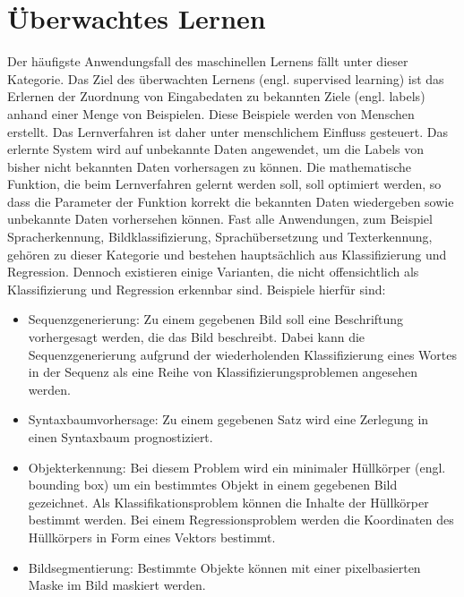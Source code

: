 \section{Überwachtes Lernen}
Der häufigste Anwendungsfall\cite{francois} des maschinellen Lernens fällt unter dieser Kategorie. Das Ziel des überwachten Lernens (engl. supervised learning) ist das Erlernen der Zuordnung von Eingabedaten zu bekannten Ziele (engl. labels) anhand einer Menge von Beispielen. Diese Beispiele werden von Menschen erstellt. Das Lernverfahren ist daher unter menschlichem Einfluss gesteuert\cite{MLkurz}. Das erlernte System wird auf unbekannte Daten angewendet, um die Labels von bisher nicht bekannten Daten vorhersagen zu können. Die mathematische Funktion, die beim Lernverfahren gelernt werden soll, soll optimiert werden, so dass die Parameter der Funktion korrekt die bekannten Daten wiedergeben sowie unbekannte Daten vorhersehen können\cite{MLkurz}.
Fast alle Anwendungen, zum Beispiel Spracherkennung, Bildklassifizierung, Sprachübersetzung und Texterkennung, gehören zu dieser Kategorie und bestehen hauptsächlich aus Klassifizierung und Regression. Dennoch existieren einige Varianten, die nicht offensichtlich als Klassifizierung und Regression erkennbar sind. Beispiele\cite{francois} hierfür sind:

\begin{itemize}
	\item Sequenzgenerierung: Zu einem gegebenen Bild soll eine Beschriftung vorhergesagt werden, die das Bild beschreibt. Dabei kann die Sequenzgenerierung aufgrund der wiederholenden Klassifizierung eines Wortes in der Sequenz als eine Reihe von Klassifizierungsproblemen angesehen werden.
	
	\item Syntaxbaumvorhersage: Zu einem gegebenen Satz wird eine Zerlegung in einen Syntaxbaum prognostiziert.
	
	\item Objekterkennung: Bei diesem Problem wird ein minimaler Hüllkörper (engl. bounding box) um ein bestimmtes Objekt in einem gegebenen Bild gezeichnet. Als Klassifikationsproblem können die Inhalte der Hüllkörper bestimmt werden. Bei einem Regressionsproblem werden die Koordinaten des Hüllkörpers in Form eines Vektors bestimmt. 
	
	\item Bildsegmentierung: Bestimmte Objekte können mit einer pixelbasierten Maske im Bild maskiert werden.
	
\end{itemize}


